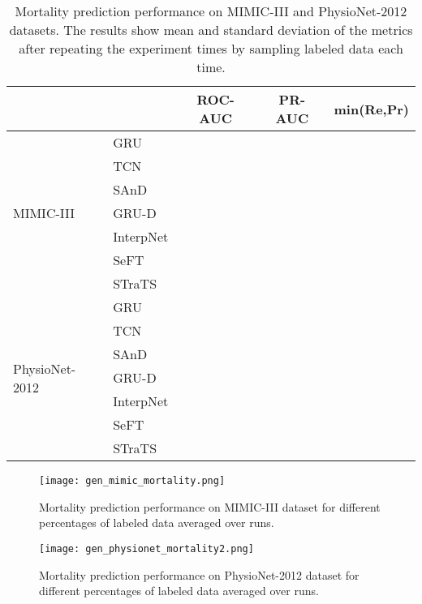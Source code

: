 \begin{table}[]
\centering
    \caption{Mortality prediction performance on MIMIC-III and PhysioNet-2012 datasets. The results show mean and standard deviation of the metrics after repeating the experiment  times by sampling  labeled data each time.}
    \label{tab:pred_perf}
    \begin{tabular}{llccc}
    \toprule
    & &ROC-AUC &PR-AUC &min(Re,Pr) \\
    \midrule
    \multirow{7}{*}{MIMIC-III}
    &GRU & & &\\
&TCN & & &\\
    &SAnD & & &\\
    &GRU-D & & &\\
    &InterpNet & & &\\
    &SeFT & & &\\
    &STraTS & & &\\
    \hline
    \multirow{7}{*}{PhysioNet-2012}
    &GRU & & &\\
    
    &TCN & & &\\
    &SAnD & & &\\
    &GRU-D & & &\\
    &InterpNet & & &\\
    &SeFT & & &\\
    &STraTS & & &\\
    \bottomrule
    \end{tabular}
\end{table}


\begin{figure}
    \centering
    \texttt{[image: gen\_mimic\_mortality.png]}
    \caption{Mortality prediction performance on MIMIC-III dataset for different percentages of labeled data averaged over  runs.}
    \label{fig:gen_mimic_mort}
\end{figure}
\begin{figure}
    \centering
    \texttt{[image: gen\_physionet\_mortality2.png]}
    \caption{Mortality prediction performance on PhysioNet-2012 dataset for different percentages of labeled data averaged over  runs.}
    \label{fig:gen_phy_mort}
\end{figure}

